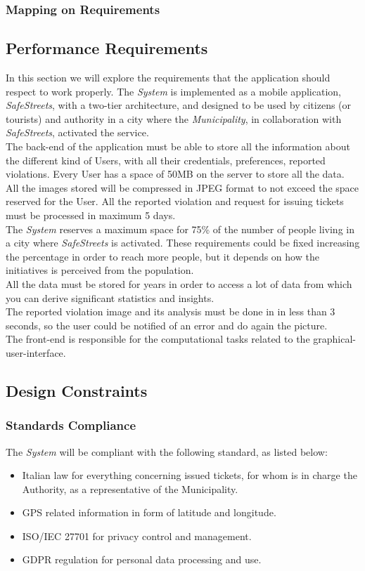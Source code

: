 \documentclass {article}
\begin{document}
	\subsubsection{Mapping on Requirements}
	\subsection{Performance Requirements}
	In this section we will explore the requirements that the application should respect to work properly. The {\it System} is implemented as a mobile application, {\it SafeStreets}, with a two-tier architecture, and designed to be used by citizens (or tourists) and authority in a city where the {\it Municipality}, in collaboration with {\it SafeStreets}, activated the service. \\
	The back-end of the application must be able to store all the information about the different kind of Users, with all their credentials, preferences, reported violations. Every User has a space of 50MB on the server to store all the data. All the images stored will be compressed in JPEG format to not exceed the space reserved for the User. All the reported violation and request for issuing tickets must be processed in maximum 5 days.\\ 
	The {\it System} reserves a maximum space for 75\% of the number of people living in a city where {\it SafeStreets} is activated. These requirements could be fixed increasing the percentage in order to reach more people, but it depends on how the initiatives is perceived from the population. \\
	All the data must be stored for years in order to access a lot of data from which you can derive significant statistics and insights. \\ 
	The reported violation image and its analysis must be done in in less than 3 seconds, so the user could be notified of an error and do again the picture. \\
	The front-end is responsible for the computational tasks related to the graphical-user-interface.
	\subsection{Design Constraints}
	\subsubsection{Standards Compliance}
	The {\it System} will be compliant with the following standard, as listed below:
	\begin{itemize}
		\item Italian law for everything concerning issued tickets, for whom is in charge the Authority, as a representative of the Municipality.
		\item GPS related information in form of latitude and longitude.
		\item ISO/IEC 27701 for privacy control and management.
		\item GDPR regulation for personal data processing and use.
	\end{itemize}
\end{document}
